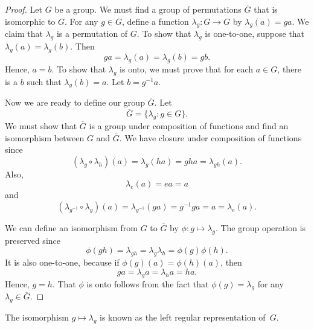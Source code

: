 \begin{proof}
Let $G$ be a group.  We must find a group of permutations $\overline{G}$ that is isomorphic to $G$.  For any $g \in G$, define a  function $\lambda_g : G \rightarrow G$ by $\lambda_g(a) = ga$.  We claim that $\lambda_g$ is a permutation of $G$.  To show that $\lambda_g$ is one-to-one, suppose that $\lambda_g(a) = \lambda_g(b)$.  Then  
\[
ga =\lambda_g(a) = \lambda_g(b) = gb.
\]
Hence, $a = b$.  To show that $\lambda_g$ is onto, we must prove that for each $a \in G$, there is a $b$ such that $\lambda_g (b) = a$.  Let $b = g^{-1} a$.  

Now we are ready to define our group $\overline{G}$. Let
\[
\overline{G} = \{ \lambda_g : g \in G \}.
\]
We must show that $\overline{G}$ is a group under composition of functions and find an isomorphism between $G$ and $\overline{G}$.  We have closure under composition of functions since 
\[
(\lambda_g \circ \lambda_h )(a) = \lambda_g(ha) = gha = \lambda_{gh} (a).
\]
Also,
\[
\lambda_e (a) = ea = a
\]
and
\[
(\lambda_{g^{-1}} \circ \lambda_g) (a) = \lambda_{g^{-1}} (ga) = g^{-1} g a = a = \lambda_e (a).
\]

We can define an isomorphism from $G$ to $\overline{G}$ by $\phi : g
\mapsto \lambda_g$. The group operation is preserved since
\[
\phi(gh) = \lambda_{gh} = \lambda_g \lambda_h = \phi(g) \phi(h).
\]
It is also one-to-one, because if $\phi(g)(a) = \phi(h)(a)$, then
\[
ga = \lambda_g a = \lambda_h a=  ha.
\]
Hence, $g = h$.  That $\phi$ is onto follows from the fact that $\phi( g ) = \lambda_g$ for any $\lambda_g \in \overline{G}$. 
\end{proof}

\medskip

The isomorphism $g \mapsto \lambda_g$ is known as the {\bfi left regular representation\/} of~$G$. 


\histhead

 


